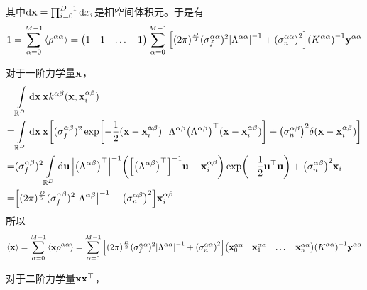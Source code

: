 \documentclass[12pt,UTF8]{article}
\begin{document}
			其中$\dd{\vb{x}}=\prod_{i=0}^{D-1}{\dd{x_i}}$是相空间体积元。于是有
			\begin{equation}
				1=\sum_{\alpha=0}^{M-1}{\ev{\rho^{\alpha\alpha}}}=\mqty(1 & 1 & \dots & 1)\sum_{\alpha=0}^{M-1}{\qty[(2\pi)^{\frac{D}{2}}(\sigma_f^{\alpha\alpha})^2\abs{\Lambda^{\alpha\alpha}}^{-1}+\qty(\sigma_n^{\alpha\alpha})^2]\qty(K^{\alpha\alpha})^{-1}\vb{y}^{\alpha\alpha}}
            \end{equation}\par
            对于一阶力学量$\vb{x}$，
            \begin{align}
                &\int\limits_{\mathbb{R}^D}{\dd{\vb{x}}\vb{x}k^{\alpha\beta}(\vb{x},\vb{x}_i^{\alpha\beta})} \nonumber \\
                =&\int\limits_{\mathbb{R}^D}{\dd{\vb{x}}\vb{x}\qty[(\sigma_f^{\alpha\beta})^2\exp[-\frac{1}{2}(\vb{x}-\vb{x}_i^{\alpha\beta})^\top\Lambda^{\alpha\beta}\qty(\Lambda^{\alpha\beta})^\top(\vb{x}-\vb{x}_i^{\alpha\beta})]+\qty(\sigma_n^{\alpha\beta})^2\delta(\vb{x}-\vb{x}_i^{\alpha\beta})]} \\
                =&(\sigma_f^{\alpha\beta})^2\int\limits_{\mathbb{R}^D}{\dd{\vb{u}}\abs{\qty(\Lambda^{\alpha\beta})^\top}^{-1}\qty(\qty[\qty(\Lambda^{\alpha\beta})^\top]^{-1}\vb{u}+\vb{x}_i^{\alpha\beta})\exp(-\frac{1}{2}\vb{u}^\top\vb{u})}+\qty(\sigma_n^{\alpha\beta})^2\vb{x}_i \\
                =&\qty[(2\pi)^{\frac{D}{2}}(\sigma_f^{\alpha\beta})^2\abs{\Lambda^{\alpha\beta}}^{-1}+\qty(\sigma_n^{\alpha\beta})^2]\vb{x}_i^{\alpha\beta}
            \end{align}
            所以
            \begin{equation}
                \ev{\vb{x}}=\sum_{\alpha=0}^{M-1}{\ev{\vb{x}\rho^{\alpha\alpha}}}=\sum_{\alpha=0}^{M-1}{\qty[(2\pi)^{\frac{D}{2}}(\sigma_f^{\alpha\alpha})^2\abs{\Lambda^{\alpha\alpha}}^{-1}+\qty(\sigma_n^{\alpha\alpha})^2]\mqty(\vb{x}_0^{\alpha\alpha} & \vb{x}_1^{\alpha\alpha} & \dots & \vb{x}_n^{\alpha\alpha})\qty(K^{\alpha\alpha})^{-1}\vb{y}^{\alpha\alpha}}
            \end{equation}\par
            对于二阶力学量$\vb{x}\vb{x}^\top$，
\end{document}
